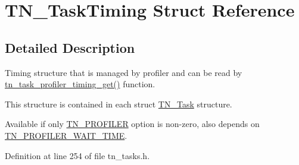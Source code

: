 \hypertarget{structTN__TaskTiming}{\section{T\+N\+\_\+\+Task\+Timing Struct Reference}
\label{structTN__TaskTiming}
}


\subsection{Detailed Description}
Timing structure that is managed by profiler and can be read by {\ttfamily \hyperlink{tn__tasks_8h_a8f90a88f54d2d49bb1de00886241edfe}{tn\+\_\+task\+\_\+profiler\+\_\+timing\+\_\+get()}} function. 

This structure is contained in each {\ttfamily struct \hyperlink{structTN__Task}{T\+N\+\_\+\+Task}} structure.

Available if only {\ttfamily \hyperlink{tn__cfg__default_8h_a49a546b18cc1f75b51d4cf8b290634dd}{T\+N\+\_\+\+P\+R\+O\+F\+I\+L\+E\+R}} option is non-\/zero, also depends on {\ttfamily \hyperlink{tn__cfg__default_8h_a1c04db5457adb54f7cc38d42b29a5ad7}{T\+N\+\_\+\+P\+R\+O\+F\+I\+L\+E\+R\+\_\+\+W\+A\+I\+T\+\_\+\+T\+I\+M\+E}}. 

Definition at line 254 of file tn\+\_\+tasks.\+h.

